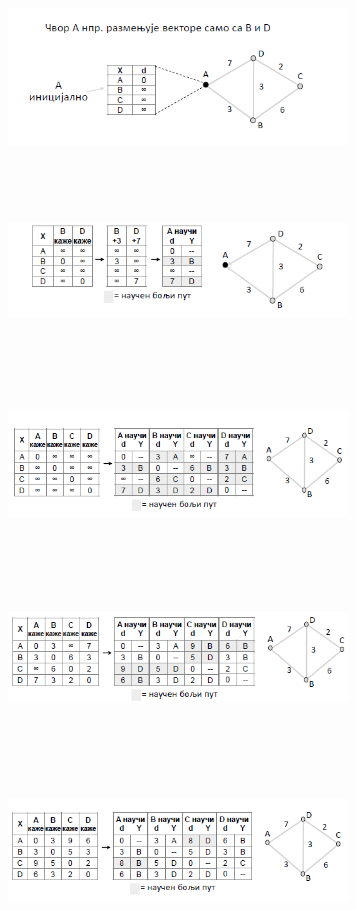 \documentclass{article} %
\begin{document}
\begin{center}
		\includegraphics[width=9cm, height=5cm]{dv1}\\
		\vskip 5mm
		\includegraphics[width=9cm, height=5cm]{dv2}\\
		\vskip 5mm
		\includegraphics[width=9cm, height=5cm]{dv3}\\
		\vskip 5mm
		\includegraphics[width=9cm, height=5cm]{dv4}\\
		\vskip 5mm
		\includegraphics[width=9cm, height=5cm]{dv5}\\

\end{center}
\end{document}
